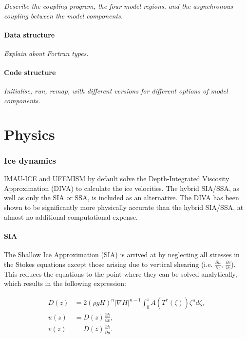 \documentclass{article}
\begin{document}
\textit{Describe the coupling program, the four model regions, and the asynchronous coupling between the model components.}

\subsection{Data structure}

\textit{Explain about Fortran types.}

\subsection{Code structure}

\textit{Initialise, run, remap, with different versions for different options of model components.}

\newpage
\part{Physics}

\section{Ice dynamics}

IMAU-ICE and UFEMISM by default solve the Depth-Integrated Viscosity Approximation (DIVA) to calculate the ice velocities. The hybrid SIA/SSA, as well as only the SIA or SSA, is included as an alternative. The DIVA has been shown to be significantly more physically accurate than the hybrid SIA/SSA, at almost no additional computational expense.

\subsection{SIA}

The Shallow Ice Approximation (SIA) is arrived at by neglecting all stresses in the Stokes equations except those arising due to vertical shearing (i.e. $\frac{\partial u}{\partial z}$, $\frac{\partial v}{\partial z}$). This reduces the equations to the point where they can be solved analytically, which results in the following expression:

\begin{align} \label{eq:SIA_01}
D(z) &= 2 {\left( \rho g H \right)}^n {\left| \nabla H \right|}^{n-1} \int_0^z A \left( T^{\ast} \left( \zeta \right) \right) \zeta^n d\zeta, \\
u(z) &= D(z) \frac{\partial h}{\partial x}, \\
v(z) &= D(z) \frac{\partial h}{\partial y}.
\end{align}
\end{document}
